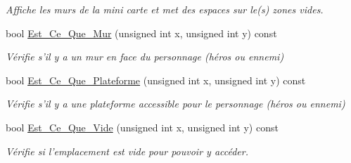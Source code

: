 \begin{DoxyCompactItemize}
\begin{DoxyCompactList}\small\item\em Affiche les murs de la mini carte et met des espaces sur le(s) zones vides. \end{DoxyCompactList}\item 
\hypertarget{classMini__Carte_a646384624b968c675b5f8be52ceb73ad}{bool \hyperlink{classMini__Carte_a646384624b968c675b5f8be52ceb73ad}{Est\+\_\+\+Ce\+\_\+\+Que\+\_\+\+Mur} (unsigned int x, unsigned int y) const }\label{classMini__Carte_a646384624b968c675b5f8be52ceb73ad}

\begin{DoxyCompactList}\small\item\em Vérifie s'il y a un mur en face du personnage (héros ou ennemi) \end{DoxyCompactList}\item 
\hypertarget{classMini__Carte_a9da689c43f60b07dd3b113de2b6ca312}{bool \hyperlink{classMini__Carte_a9da689c43f60b07dd3b113de2b6ca312}{Est\+\_\+\+Ce\+\_\+\+Que\+\_\+\+Plateforme} (unsigned int x, unsigned int y) const }\label{classMini__Carte_a9da689c43f60b07dd3b113de2b6ca312}

\begin{DoxyCompactList}\small\item\em Vérifie s'il y a une plateforme accessible pour le personnage (héros ou ennemi) \end{DoxyCompactList}\item 
\hypertarget{classMini__Carte_a3a045e6289f6a58665fef737d0cb9ca7}{bool \hyperlink{classMini__Carte_a3a045e6289f6a58665fef737d0cb9ca7}{Est\+\_\+\+Ce\+\_\+\+Que\+\_\+\+Vide} (unsigned int x, unsigned int y) const }\label{classMini__Carte_a3a045e6289f6a58665fef737d0cb9ca7}

\begin{DoxyCompactList}\small\item\em Vérifie si l'emplacement est vide pour pouvoir y accéder. \end{DoxyCompactList}\end{DoxyCompactItemize}
